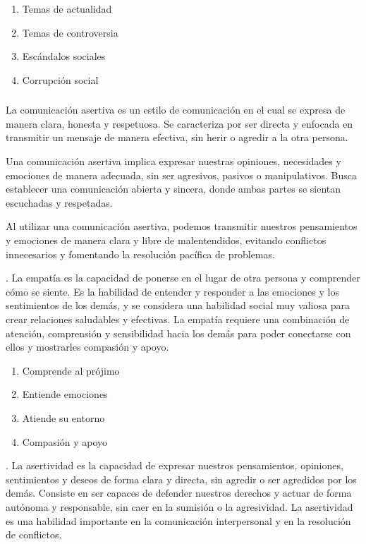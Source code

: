 \documentclass[12pt,a4paper]{article}
\begin{document}
\begin{enumerate}
\item  Temas de actualidad
\item  Temas de controversia
\item  Escándalos sociales
\item  Corrupción social
\end{enumerate}


\subsubsection{\variabled}%
La comunicación asertiva es un estilo de comunicación en el cual se expresa de manera clara, honesta y respetuosa. Se caracteriza por ser directa y enfocada en transmitir un mensaje de manera efectiva, sin herir o agredir a la otra persona.

Una comunicación asertiva implica expresar nuestras opiniones, necesidades y emociones de manera adecuada, sin ser agresivos, pasivos o manipulativos. Busca establecer una comunicación abierta y sincera, donde ambas partes se sientan escuchadas y respetadas.

Al utilizar una comunicación asertiva, podemos transmitir nuestros pensamientos y emociones de manera clara y libre de malentendidos, evitando conflictos innecesarios y fomentando la resolución pacífica de problemas.



\noindent\textbf{\dimd}. La empatía es la capacidad de ponerse en el lugar de otra persona y comprender cómo se siente. Es la habilidad de entender y responder a las emociones y los sentimientos de los demás, y se considera una habilidad social muy valiosa para crear relaciones saludables y efectivas. La empatía requiere una combinación de atención, comprensión y sensibilidad hacia los demás para poder conectarse con ellos y mostrarles compasión y apoyo.

\begin{enumerate}
\item  Comprende al prójimo
\item  Entiende emociones
\item  Atiende su entorno
\item  Compasión y apoyo
\end{enumerate}

\noindent\textbf{\dimdd}.	La asertividad es la capacidad de expresar nuestros pensamientos, opiniones, sentimientos y deseos de forma clara y directa, sin agredir o ser agredidos por los demás. Consiste en ser capaces de defender nuestros derechos y actuar de forma autónoma y responsable, sin caer en la sumisión o la agresividad. La asertividad es una habilidad importante en la comunicación interpersonal y en la resolución de conflictos.
\end{document}

